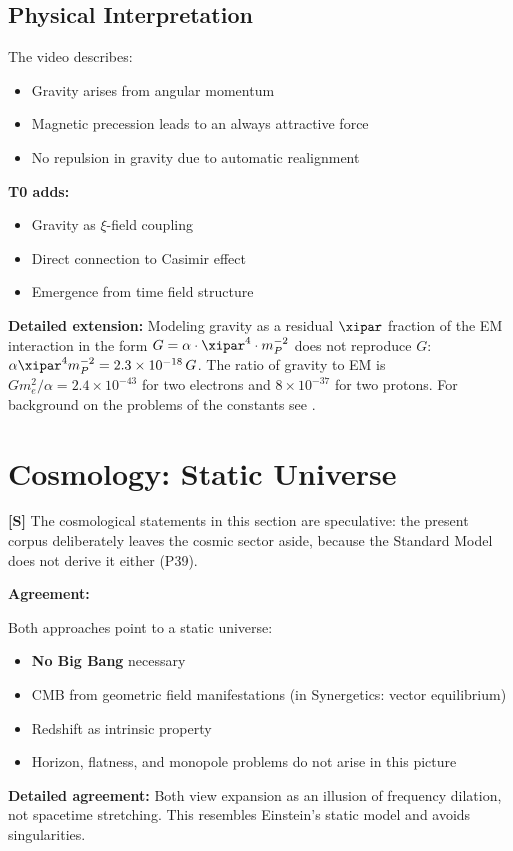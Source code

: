 	\subsection{Physical Interpretation}
	
	The video describes:
	\begin{itemize}
		\item Gravity arises from angular momentum
		\item Magnetic precession leads to an always attractive force
		\item No repulsion in gravity due to automatic realignment
	\end{itemize}
	
	\textbf{T0 adds:}
	\begin{itemize}
		\item Gravity as $\xi$-field coupling
		\item Direct connection to Casimir effect
		\item Emergence from time field structure
	\end{itemize}
	
	\textbf{Detailed extension:} Modeling gravity as a residual $\xipar$ fraction of the EM interaction in the form $G = \alpha \cdot \xipar^4 \cdot m_P^{-2}$ does not reproduce $G$: $\alpha\xipar^4 m_P^{-2} = 2.3\times10^{-18}\,G$. The ratio of gravity to EM is $G m_e^2/\alpha = 2.4\times10^{-43}$ for two electrons and $8\times10^{-37}$ for two protons. For background on the problems of the constants see \cite{weinberg_1989}.
	
	\section{Cosmology: Static Universe}
	
	\textbf{[S]} The cosmological statements in this section are speculative: the present corpus deliberately leaves the cosmic sector aside, because the Standard Model does not derive it either (P39).
	
	\begin{gemeinsam}
		\textbf{Agreement:}
		
		Both approaches point to a static universe:
		\begin{itemize}
			\item \textbf{No Big Bang} necessary
			\item CMB from geometric field manifestations (in Synergetics: vector equilibrium)
			\item Redshift as intrinsic property
			\item Horizon, flatness, and monopole problems do not arise in this picture
		\end{itemize}
		
		\textbf{Detailed agreement:} Both view expansion as an illusion of frequency dilation, not spacetime stretching. This resembles Einstein's static model \cite{einstein_1917} and avoids singularities.
	\end{gemeinsam}
	
